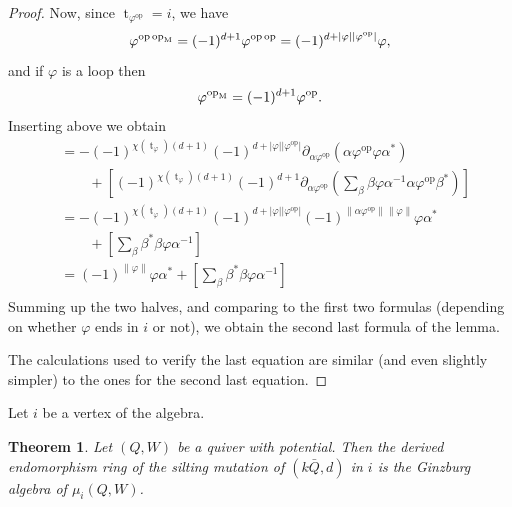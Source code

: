 \documentclass[a4paper,11pt]{amsart}
\newtheorem{theorem}{Theorem}
\theoremstyle{definition}
\DeclareMathOperator{\op}{op}
\newcommand{\m}{_{\rm M}}
\newcommand{\ci}[1]{\chi(#1)}
\newcommand{\ta}[1]{\operatorname{t}_{#1}}
\numberwithin{theorem}{section}
\begin{document}
\begin{proof}
Now, since $\ta{\varphi^{\op}} = i$, we have
\[ \varphi^{\op\op\m} = (-1)^{d+1} \varphi^{\op\op} = (-1)^{d + |\varphi| |\varphi^{\op}|} \varphi, \]
and if $\varphi$ is a loop then
\[ \varphi^{\op\m} = (-1)^{d+1} \varphi^{\op}. \]
Inserting above we obtain
\begin{align*}
& = - (-1)^{\ci{\ta\varphi} (d+1)} (-1)^{d + |\varphi| |\varphi^{\op}|} \partial_{\alpha \varphi^{\op}} ( \alpha \varphi^{\op} \varphi \alpha^* ) \\
& \qquad + \left[ (-1)^{\ci{\ta\varphi} (d+1)} (-1)^{d+1} \partial_{\alpha \varphi^{\op}} (\sum_{\beta} \beta \varphi \alpha^{-1} \alpha \varphi^{\op} \beta^*) \right] \\
& = - (-1)^{\ci{\ta\varphi} (d+1)} (-1)^{d + |\varphi| |\varphi^{\op}|} (-1)^{\| \alpha \varphi^{\op} \| \| \varphi \|} \varphi \alpha^* \\
& \qquad + \left[ \sum_{\beta} \beta^* \beta \varphi \alpha^{-1}  \right] \\
& = (-1)^{ \| \varphi \|} \varphi \alpha^* + \left[ \sum_{\beta} \beta^* \beta \varphi \alpha^{-1}  \right] \\
\end{align*}
Summing up the two halves, and comparing to the first two formulas (depending on whether $\varphi$ ends in $i$ or not), we obtain the second last formula of the lemma.

The calculations used to verify the last equation are similar (and even slightly simpler) to the ones for the second last equation.
\end{proof}

Let $i$ be a vertex of the algebra.

\begin{theorem}
Let $(Q, W)$ be a quiver with potential. Then the derived endomorphism ring of the silting mutation of $(k\bar{Q}, d)$ in $i$ is the Ginzburg algebra of $\mu_i(Q, W)$.
\end{theorem}
\end{document}
